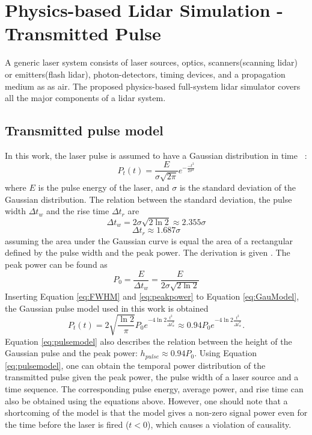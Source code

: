 \chapter{Physics-based Lidar Simulation - Transmitted Pulse}
A generic laser system consists of laser sources, optics, scanners(scanning lidar) or emitters(flash lidar), photon-detectors, timing devices, and a propagation medium as as air. The proposed physics-based full-system lidar simulator covers all the major components of a lidar system. 

\section{Transmitted pulse model}
In this work, the laser pulse is assumed to have a Gaussian distribution in time ~\citep{richmond2010direct,Budge2006SimulationLadarSIM}:
\begin{equation}  \label{eq:GauModel}
P_t(t) =\frac{E}{\sigma \sqrt{2\pi}}e^{-\frac{-t^2}{2\sigma^2}}
\end{equation}
where $E$ is the pulse energy of the laser, and $\sigma$ is the standard deviation of the Gaussian distribution. The relation between the standard deviation, the pulse width $\Delta t_w$ and the rise time $\Delta t_r$ are
\begin{equation} \label{eq:FWHM}
\Delta t_w=2\sigma\sqrt{2\ln2}\approx2.355\sigma
\end{equation}
\begin{equation} \label{eq:rt}
\Delta t_r\approx1.687\sigma
\end{equation}
assuming the area under the Gaussian curve is equal the area of a rectangular defined by the pulse width and the peak power. The derivation is given . The peak power can be found as
\begin{equation} \label{eq:peakpower}
P_0 = \frac{E}{\Delta t_w} =\frac{E}{2\sigma\sqrt{2\ln2}}    
\end{equation}
Inserting Equation \eqref{eq:FWHM} and \eqref{eq:peakpower} to Equation \eqref{eq:GauModel}, the Gaussian pulse model used in this work is obtained
\begin{equation}\label{eq:pulsemodel}
P_t(t)=2\sqrt{\frac{\ln2}{\pi}}P_0e^{-4\ln2\frac{t^2}{\Delta t_w^2}}\approx0.94P_0e^{-4\ln2\frac{t^2}{\Delta t_w^2}}.
\end{equation}
Equation \eqref{eq:pulsemodel} also describes the relation between the height of the Gaussian pulse and the peak power: $h_{pulse}\approx0.94P_0$. Using Equation \eqref{eq:pulsemodel}, one can obtain the temporal power distribution of the transmitted pulse given the peak power, the pulse width of a laser source and a time sequence. The corresponding pulse energy, average power, and rise time can also be obtained using the equations above. However, one should note that a shortcoming of the model is that the model gives a non-zero signal power even for the time before the laser is fired ($t<0$), which causes a violation of causality.

